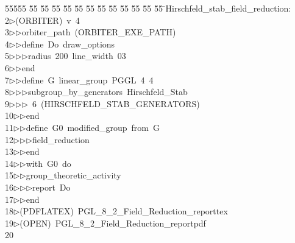 %
%
\begin{tabbing}
55555 \= 55 \= 55 \= 55 \= 55 \= 55 \= 55 \= 55 \= 55 \= 55 \= 55 \= 55 \= 55 \= \>Hirschfeld\_stab\_field\_reduction:\\[0pt]
2\>$\triangleright$\>(ORBITER)\ v\ 4\ \\[0pt]
3\>$\triangleright$\>$\triangleright$\>orbiter\_path\ (ORBITER\_EXE\_PATH)\ \\[0pt]
4\>$\triangleright$\>$\triangleright$\>define\ Do\ draw\_options\ \\[0pt]
5\>$\triangleright$\>$\triangleright$\>$\triangleright$\>radius\ 200\ line\_width\ 03\ \\[0pt]
6\>$\triangleright$\>$\triangleright$\>end\ \\[0pt]
7\>$\triangleright$\>$\triangleright$\>define\ G\ linear\_group\ PGGL\ 4\ 4\ \\[0pt]
8\>$\triangleright$\>$\triangleright$\>$\triangleright$\>subgroup\_by\_generators\ Hirschfeld\_Stab\ \\[0pt]
9\>$\triangleright$\>$\triangleright$\>$\triangleright$\ 6\ (HIRSCHFELD\_STAB\_GENERATORS)\ \\[0pt]
10\>$\triangleright$\>$\triangleright$\>end\ \\[0pt]
11\>$\triangleright$\>$\triangleright$\>define\ G0\ modified\_group\ from\ G\ \\[0pt]
12\>$\triangleright$\>$\triangleright$\>$\triangleright$\>field\_reduction\ \\[0pt]
13\>$\triangleright$\>$\triangleright$\>end\ \\[0pt]
14\>$\triangleright$\>$\triangleright$\>with\ G0\ do\ \\[0pt]
15\>$\triangleright$\>$\triangleright$\>group\_theoretic\_activity\ \\[0pt]
16\>$\triangleright$\>$\triangleright$\>$\triangleright$\>report\ Do\ \\[0pt]
17\>$\triangleright$\>$\triangleright$\>end\\[0pt]
18\>$\triangleright$\>(PDFLATEX)\ PGL\_8\_2\_Field\_Reduction\_reporttex\\[0pt]
19\>$\triangleright$\>(OPEN)\ PGL\_8\_2\_Field\_Reduction\_reportpdf\\[0pt]
20\>\end{tabbing}
